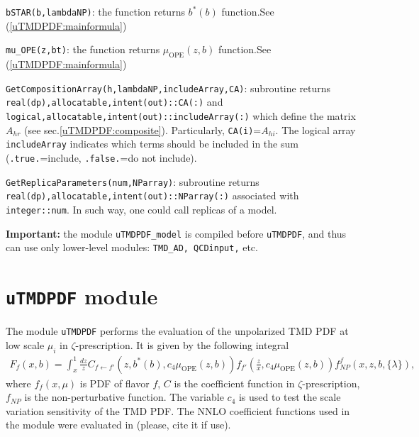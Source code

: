 \documentclass[prd,nofootinbib,eqsecnum,final]{revtex4}
\newcommand{\ot}{\leftarrow}
\renewcommand{\(}{\left(}
\renewcommand{\)}{\right)}
\renewcommand{\[}{\left[}
\renewcommand{\]}{\right]}
\begin{document}
\texttt{bSTAR(b,lambdaNP)}: the function returns $b^*(b)$ function.See (\ref{uTMDPDF:mainformula})

\vspace{2mm}

\texttt{mu\_OPE(z,bt)}: the function returns $\mu_\text{OPE}(z,b)$ function.See (\ref{uTMDPDF:mainformula})

\vspace{2mm}

\texttt{GetCompositionArray(h,lambdaNP,includeArray,CA)}: subroutine returns \texttt{real(dp),allocatable,intent(out)::CA(:)} and \texttt{logical,allocatable,intent(out)::includeArray(:)} which define the matrix $A_{hr}$ (see sec.\ref{uTMDPDF:composite}). Particularly, \texttt{CA(i)}=$A_{hi}$. The logical array \texttt{includeArray} indicates which terms should be included in the sum (\texttt{.true.}=include, \texttt{.false.}=do not include).

\vspace{2mm}

\texttt{GetReplicaParameters(num,NParray)}: subroutine returns \texttt{real(dp),allocatable,intent(out)::NParray(:)} associated with \texttt{integer::num}. In such way, one could call replicas of a model.

\vspace{2mm}



\textbf{Important:} the module \texttt{uTMDPDF\_model} is compiled before \texttt{uTMDPDF}, and thus can use only lower-level modules: \texttt{TMD\_AD, QCDinput,} etc.

\newpage
\section{\texttt{uTMDPDF} module}
\label{uTMDPDF}

The module \texttt{uTMDPDF} performs the evaluation of the unpolarized TMD PDF at low scale $\mu_i$ in $\zeta$-prescription. It is given by the following integral
\begin{eqnarray}\label{uTMDPDF:mainformula}
F_f(x,b)=\int_x^1 \frac{dz}{z}C_{f\ot f'}(z,b^*(b),c_4\mu_\text{OPE}(z,b))f_{f'}(\frac{z}{x},c_4\mu_\text{OPE}(z,b))f^f_{NP}(x,z,b,\{\lambda\}),
\end{eqnarray}
where $f_f(x,\mu)$ is PDF of flavor $f$, $C$ is the coefficient function in $\zeta$-prescription, $f_{NP}$ is the non-perturbative function. The variable $c_4$ is used to test the scale variation sensitivity of the TMD PDF. The NNLO coefficient functions used in the module were evaluated in \cite{Echevarria:2016scs} (please, cite it if use).
\end{document}

